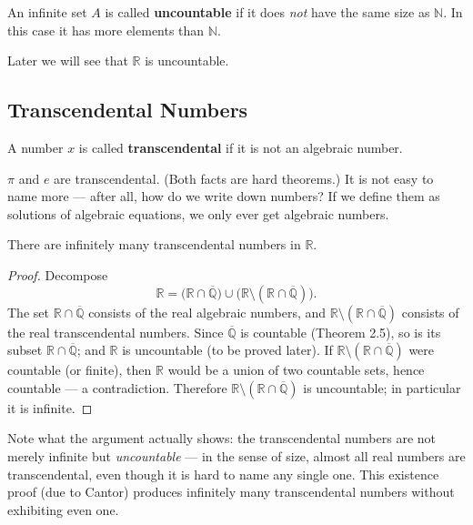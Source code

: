 \documentclass[11pt]{report}
\begin{document}
\begin{defbox}[Uncountable]
An infinite set $A$ is called \textbf{uncountable} if it does \emph{not} have the same size as $\mathbb{N}$. In this case it has more elements than $\mathbb{N}$.
\end{defbox}

Later we will see that $\mathbb{R}$ is uncountable.

\subsection{Transcendental Numbers}

\begin{defbox}
A number $x$ is called \textbf{transcendental} if it is not an algebraic number.
\end{defbox}

\begin{exbox}[$\pi$ and $e$]
$\pi$ and $e$ are transcendental. (Both facts are hard theorems.) It is not easy to name more --- after all, how do we write down numbers? If we define them as solutions of algebraic equations, we only ever get algebraic numbers.
\end{exbox}

\begin{thmbox}
There are infinitely many transcendental numbers in $\mathbb{R}$.
\end{thmbox}

\begin{proof}
Decompose
\[
\mathbb{R} = \bigl(\mathbb{R} \cap \overline{\mathbb{Q}}\bigr) \cup \bigl(\mathbb{R} \setminus (\mathbb{R} \cap \overline{\mathbb{Q}})\bigr).
\]
The set $\mathbb{R} \cap \overline{\mathbb{Q}}$ consists of the real algebraic numbers, and $\mathbb{R} \setminus (\mathbb{R} \cap \overline{\mathbb{Q}})$ consists of the real transcendental numbers. Since $\overline{\mathbb{Q}}$ is countable (Theorem 2.5), so is its subset $\mathbb{R} \cap \overline{\mathbb{Q}}$; and $\mathbb{R}$ is uncountable (to be proved later). If $\mathbb{R} \setminus (\mathbb{R} \cap \overline{\mathbb{Q}})$ were countable (or finite), then $\mathbb{R}$ would be a union of two countable sets, hence countable --- a contradiction. Therefore $\mathbb{R} \setminus (\mathbb{R} \cap \overline{\mathbb{Q}})$ is uncountable; in particular it is infinite.
\end{proof}

\begin{rembox}
Note what the argument actually shows: the transcendental numbers are not merely infinite but \emph{uncountable} --- in the sense of size, almost all real numbers are transcendental, even though it is hard to name any single one. This existence proof (due to Cantor) produces infinitely many transcendental numbers without exhibiting even one.
\end{rembox}
\end{document}
